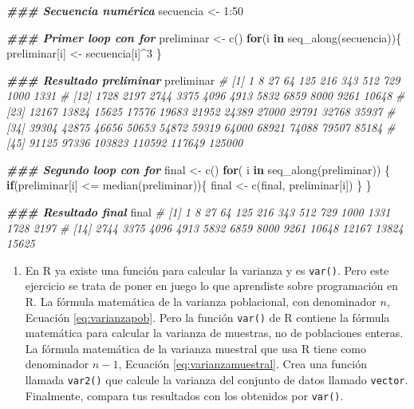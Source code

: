 \documentclass[
]{article}
\newenvironment{Shaded}{\begin{snugshade}}{\end{snugshade}}
\newcommand{\CommentTok}[1]{\textcolor[rgb]{0.56,0.35,0.01}{\textit{#1}}}
\newcommand{\ControlFlowTok}[1]{\textcolor[rgb]{0.13,0.29,0.53}{\textbf{#1}}}
\newcommand{\DecValTok}[1]{\textcolor[rgb]{0.00,0.00,0.81}{#1}}
\newcommand{\DocumentationTok}[1]{\textcolor[rgb]{0.56,0.35,0.01}{\textbf{\textit{#1}}}}
\newcommand{\FunctionTok}[1]{\textcolor[rgb]{0.00,0.00,0.00}{#1}}
\newcommand{\NormalTok}[1]{#1}
\newcommand{\OtherTok}[1]{\textcolor[rgb]{0.56,0.35,0.01}{#1}}
\newcommand{\SpecialCharTok}[1]{\textcolor[rgb]{0.00,0.00,0.00}{#1}}
\providecommand{\tightlist}{%
  \setlength{\itemsep}{0pt}\setlength{\parskip}{0pt}}
\theoremstyle{definition}
\theoremstyle{definition}
\theoremstyle{definition}
\theoremstyle{definition}
\theoremstyle{remark}
\begin{document}
\begin{Shaded}
\begin{Highlighting}[]
\DocumentationTok{\#\#\# Secuencia numérica}
\NormalTok{secuencia }\OtherTok{\textless{}{-}} \DecValTok{1}\SpecialCharTok{:}\DecValTok{50}

\DocumentationTok{\#\#\# Primer loop con for}
\NormalTok{preliminar }\OtherTok{\textless{}{-}} \FunctionTok{c}\NormalTok{()}
\ControlFlowTok{for}\NormalTok{(i }\ControlFlowTok{in} \FunctionTok{seq\_along}\NormalTok{(secuencia))\{}
\NormalTok{  preliminar[i] }\OtherTok{\textless{}{-}}\NormalTok{ secuencia[i]}\SpecialCharTok{\^{}}\DecValTok{3}
\NormalTok{\}}

\DocumentationTok{\#\#\# Resultado preliminar}
\NormalTok{preliminar}
\CommentTok{\#  [1]      1      8     27     64    125    216    343    512    729   1000   1331}
\CommentTok{\# [12]   1728   2197   2744   3375   4096   4913   5832   6859   8000   9261  10648}
\CommentTok{\# [23]  12167  13824  15625  17576  19683  21952  24389  27000  29791  32768  35937}
\CommentTok{\# [34]  39304  42875  46656  50653  54872  59319  64000  68921  74088  79507  85184}
\CommentTok{\# [45]  91125  97336 103823 110592 117649 125000}

\DocumentationTok{\#\#\# Segundo loop con for}
\NormalTok{final }\OtherTok{\textless{}{-}} \FunctionTok{c}\NormalTok{()}
\ControlFlowTok{for}\NormalTok{( i }\ControlFlowTok{in} \FunctionTok{seq\_along}\NormalTok{(preliminar)) \{}
  \ControlFlowTok{if}\NormalTok{(preliminar[i] }\SpecialCharTok{\textless{}=} \FunctionTok{median}\NormalTok{(preliminar))\{}
\NormalTok{    final }\OtherTok{\textless{}{-}} \FunctionTok{c}\NormalTok{(final, preliminar[i])}
\NormalTok{  \}}
\NormalTok{\}}

\DocumentationTok{\#\#\# Resultado final}
\NormalTok{final}
\CommentTok{\#  [1]     1     8    27    64   125   216   343   512   729  1000  1331  1728  2197}
\CommentTok{\# [14]  2744  3375  4096  4913  5832  6859  8000  9261 10648 12167 13824 15625}
\end{Highlighting}
\end{Shaded}

\begin{enumerate}
\def\labelenumi{\arabic{enumi}.}
\tightlist
\item
  En R ya existe una función para calcular la varianza y es \texttt{var()}. Pero este ejercicio se trata de poner en juego lo que aprendiste sobre programación en R. La fórmula matemática de la varianza poblacional, con denominador \(n\), Ecuación \eqref{eq:varianzapob}. Pero la función \texttt{var()} de R contiene la fórmula matemática para calcular la varianza de muestras, no de poblaciones enteras. La fórmula matemática de la varianza muestral que usa R tiene como denominador \(n-1\), Ecuación \eqref{eq:varianzamuestral}. Crea una función llamada \texttt{var2()} que calcule la varianza del conjunto de datos llamado \texttt{vector}. Finalmente, compara tus resultados con los obtenidos por \texttt{var()}.
\end{enumerate}
\end{document}
